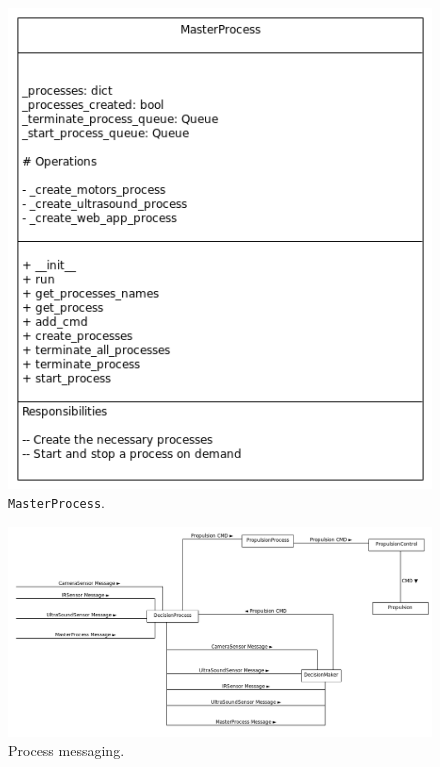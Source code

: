 \begin{figure}[!htb]
	\begin{center}
		\includegraphics[scale=0.480]{imgs/design_2.png}
	\end{center}
	\caption{ \texttt{MasterProcess}.}
	\label{design_2}
\end{figure}

\begin{figure}[!htb]
	\begin{center}
		\includegraphics[scale=0.380]{imgs/design_3.png}
	\end{center}
	\caption{ Process messaging.}
	\label{design_3}
\end{figure}
